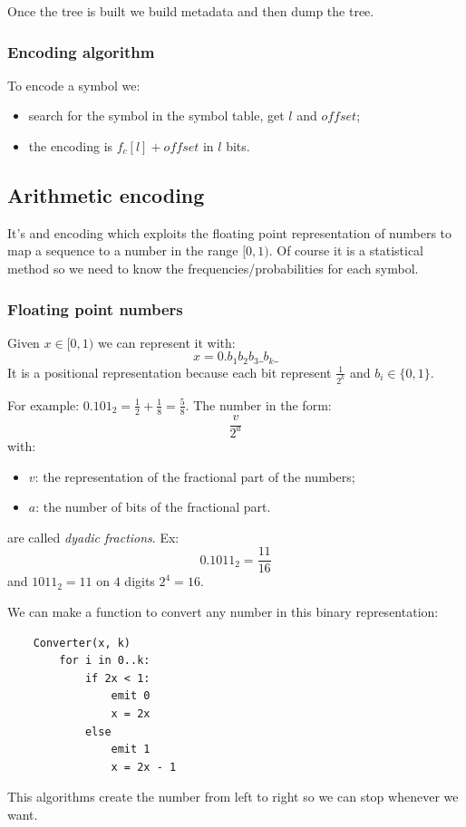 Once the tree is built we build metadata and then dump the tree.

\subsubsection{Encoding algorithm}
To encode a symbol we:
\begin{itemize}
    \item search for the symbol in the symbol table, get $l$ and $offset$;
    \item the encoding is $f_c[l] + offset$ in $l$ bits.
\end{itemize}

\subsection{Arithmetic encoding}
It's and encoding which exploits the floating point representation of numbers to map a sequence to a number in the range $[0, 1)$.
Of course it is a statistical method so we need to know the frequencies/probabilities for each symbol.

\subsubsection{Floating point numbers}
Given $x \in [0, 1)$ we can represent it with:
$$
    x = 0.b_1b_2b_3\_b_k\_
$$
It is a positional representation because each bit represent $\frac{1}{2^k}$ and $b_i \in \{0, 1\}$.

For example: $0.101_2 = \frac{1}{2} + \frac{1}{8} = \frac{5}{8}$.
The number in the form:
$$
    \frac{v}{2^a}
$$
with:
\begin{itemize}
    \item $v$: the representation of the fractional part of the numbers;
    \item $a$: the number of bits of the fractional part.
\end{itemize}
are called \emph{dyadic fractions}.
Ex:
$$
    0.1011_2 = \frac{11}{16}
$$
and $1011_2 = 11$ on $4$ digits $2^4 = 16$.

We can make a function to convert any number in this binary representation:
\begin{verbatim}
    Converter(x, k)
        for i in 0..k:
            if 2x < 1:
                emit 0
                x = 2x
            else
                emit 1
                x = 2x - 1
\end{verbatim}
This algorithms create the number from left to right so we can stop whenever we want.

